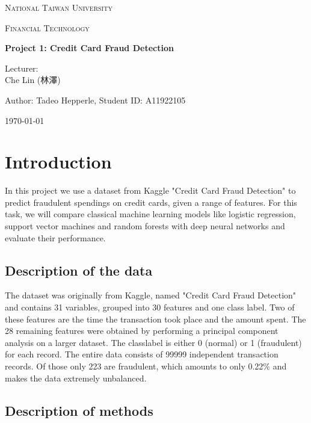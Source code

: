 \documentclass[utf8x]{ctexart}
\begin{document}
\begin{titlepage}
  \centering
  {\scshape\LARGE National Taiwan University \par}
  \vspace{1cm}
  {\scshape\Large Financial Technology \par}
  \vspace{2cm}
  {\huge\bfseries Project 1: Credit Card Fraud Detection\par}
  \vspace{2cm}
  {\Large Lecturer:\\
    Che Lin (林澤) \par}
  \vspace{1cm}
  {\Large Author: Tadeo Hepperle, Student ID: A11922105 \par}
  \vfill
  {\large \today\par}
\end{titlepage}


\tableofcontents

\cleardoublepage

\section{Introduction}

In this project we use a dataset from Kaggle "Credit Card Fraud Detection" to predict fraudulent spendings on credit cards, given a range of features. For this task, we will compare classical machine learning models like logistic regression, support vector machines and random forests with deep neural networks and evaluate their performance.

\subsection{Description of the data}

The dataset was originally from Kaggle, named "Credit Card Fraud Detection" and contains 31 variables, grouped into 30 features and one class label. Two of these features are the time the transaction took place and the amount spent. The 28 remaining features were obtained by performing a principal component analysis on a larger dataset. The classlabel is either 0 (normal) or 1 (fraudulent) for each record. The entire data consists of 99999 independent transaction records. Of those only 223 are fraudulent, which amounts to only 0.22\% and makes the data extremely unbalanced.

\subsection{Description of methods}
\end{document}
